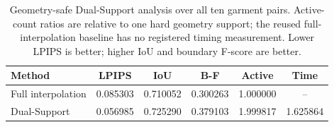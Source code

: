 \begin{table}[t]
\centering
\small
\begin{tabular*}{\textwidth}{@{\extracolsep{\fill}}lccccc@{}}
\toprule
Method & LPIPS & IoU & B-F & Active & Time \\
\midrule
Full interpolation & 0.085303 & 0.710052 & 0.300263 & 1.000000 & -- \\
Dual-Support & 0.056985 & 0.725290 & 0.379103 & 1.999817 & 1.625864 \\
\bottomrule
\end{tabular*}
\caption{Geometry-safe Dual-Support analysis over all ten garment pairs. Active-count ratios are relative to one hard geometry support; the reused full-interpolation baseline has no registered timing measurement. Lower LPIPS is better; higher IoU and boundary F-score are better.}
\label{tab:dual-support}
\end{table}

